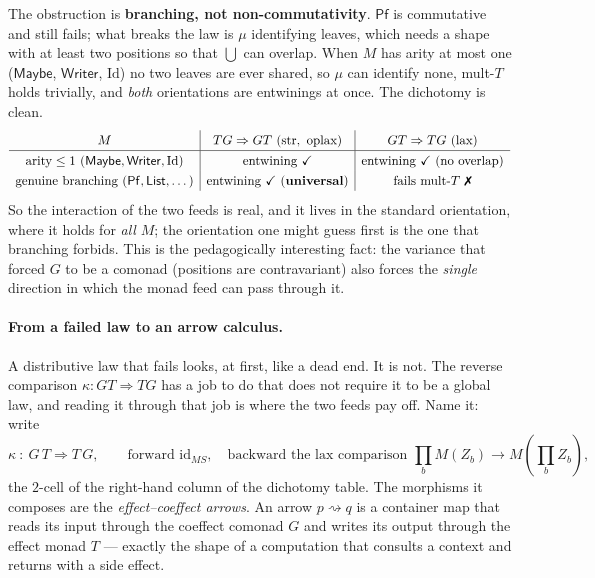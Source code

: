 \documentclass[11pt,a4paper]{book}
\newcommand{\id}{\mathrm{id}}
\newcommand{\str}{\mathrm{str}}
\theoremstyle{plain}
\theoremstyle{definition}
\theoremstyle{remark}
\begin{document}
The obstruction is \textbf{branching, not non-commutativity}. $\mathsf{Pf}$ is commutative and still
fails; what breaks the law is $\mu$ identifying leaves, which needs a shape with at least two positions
so that $\bigcup$ can overlap. When $M$ has arity at most one ($\mathsf{Maybe}$, $\mathsf{Writer}$,
$\mathrm{Id}$) no two leaves are ever shared, so $\mu$ can identify none, mult-$T$ holds trivially, and
\emph{both} orientations are entwinings at once. The dichotomy is clean.
\[
  \renewcommand{\arraystretch}{1.3}
  \begin{array}{c|c|c}
    M & TG\Rightarrow GT\ (\str,\text{ oplax}) & GT\Rightarrow TG\ (\text{lax})\\\hline
    \text{arity}\le 1\ (\mathsf{Maybe},\mathsf{Writer},\mathrm{Id}) & \text{entwining }\checkmark
      & \text{entwining }\checkmark\ (\text{no overlap})\\
    \text{genuine branching}\ (\mathsf{Pf},\mathsf{List},\dots) & \text{entwining }\checkmark\ (\textbf{universal})
      & \text{fails mult-}T\ \text{\ding{55}}
  \end{array}
\]
So the interaction of the two feeds is real, and it lives in the standard orientation, where it holds for
\emph{all} $M$; the orientation one might guess first is the one that branching forbids. This is the
pedagogically interesting fact: the variance that forced $G$ to be a comonad (positions are
contravariant) also forces the \emph{single} direction in which the monad feed can pass through it.

\paragraph{From a failed law to an arrow calculus.} A distributive law that fails looks, at first,
like a dead end. It is not. The reverse comparison $\kappa\colon GT\Rightarrow TG$ has a job to do
that does not require it to be a global law, and reading it through that job is where the two feeds
pay off. Name it: write
\[
  \kappa\ \colon\ G\,T\Longrightarrow T\,G,\qquad
  \text{forward }\id_{MS},\quad\text{backward the lax comparison }\textstyle\prod_{b}M(Z_{b})\to M(\prod_{b}Z_{b}),
\]
the $2$-cell of the right-hand column of the dichotomy table. The morphisms it composes are the
\emph{effect--coeffect arrows}. An arrow $p\rightsquigarrow q$ is a container map that reads its input
through the coeffect comonad $G$ and writes its output through the effect monad $T$ --- exactly the
shape of a computation that consults a context and returns with a side effect.
\end{document}
